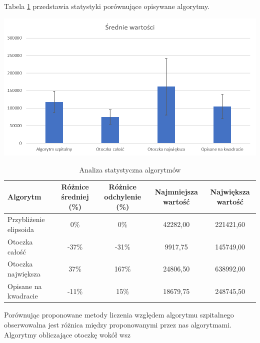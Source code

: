 \documentclass[a4paper,11pt,twoside]{report}
\theoremstyle{definition}
\begin{document}
Tabela \ref{Analiza statystyczna algorytmów} przedstawia statystyki porównujące opisywane algorytmy. 

\begin{minipage}{\linewidth}
	\centering
	\includegraphics[width=\textwidth]{PorownanieMetod.png}
\end{minipage}

\begin{table}[h!]
\caption{Analiza statystyczna algorytmów}
\centering
\begin{tabular}{|l|c|c|c|c|} \hline  
Algorytm & Różnice średniej (\%) & Różnice odchylenie (\%) & Najmniejsza wartość & Największa wartość \\ \hline 
Przybliżenie elipsoida    & 0\%	& 0\% & 42282,00	& 221421,60 \\ \hline
Otoczka całość	        & -37\%	& -31\% & 9917,75	& 145749,00 \\ \hline
Otoczka największa	    & 37\%	& 167\% & 24806,50	& 638992,00 \\ \hline
Opisane na kwadracie	& -11\%	& 15\% & 18679,75	& 248745,50 \\ \hline
\end{tabular}
\label{Analiza statystyczna algorytmów}
\end{table}

Porównując proponowane metody liczenia względem algorytmu szpitalnego obserwowalna jest różnica między proponowanymi przez nas algorytmami. Algorytmy obliczające otoczkę wokół wsz
\end{document}
